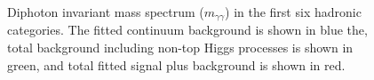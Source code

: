 \begin{figure}[htbp]
  \caption{Diphoton invariant mass spectrum ($m_{\gamma\gamma}$) in the first six hadronic categories. The fitted continuum background is shown in blue the, total background including non-top Higgs processes is shown in green, and total fitted signal plus background is shown in red.}
    \label{fig:invmass_had1}
\end{figure}

